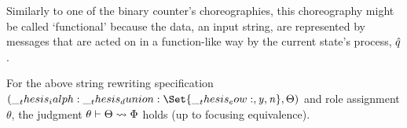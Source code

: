 Similarly to one of the binary counter's choreographies, this choreography might be called \enquote*{functional} because the data, an input string, are represented by messages that are acted on in a function-like way by the current state's process, $\hat{q}$.

\begin{proposition}\label{prop:formula-as-process:nfa-functional-chorsig}
  For the above string rewriting specification $(\ialph \dunion \Set{\eow, \symacc, \symrej}, \srsig)$ and role assignment $\theta$, the judgment $\theta \vdash \Theta \rightsquigarrow \Phi$ holds (up to focusing equivalence).
\end{proposition}

